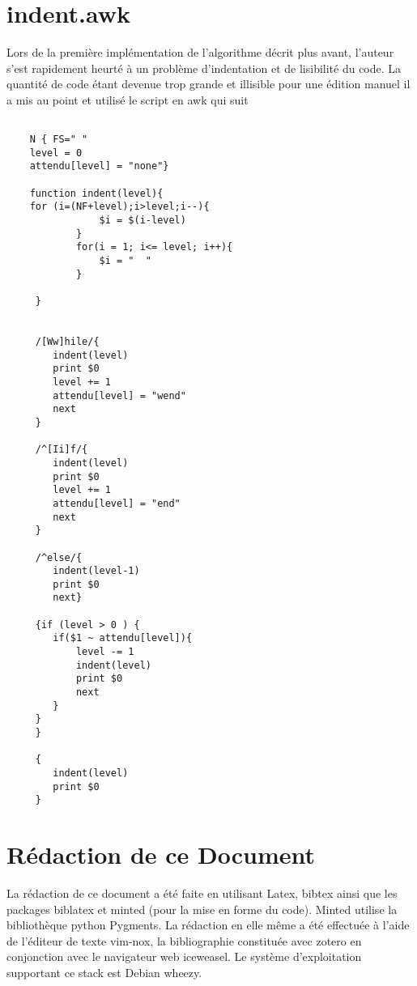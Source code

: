 \documentclass[11pt]{report}
\begin{document}
\section{indent.awk}
Lors de la première implémentation de l'algorithme décrit plus avant, l'auteur s'est rapidement heurté à un problème d'indentation et de lisibilité du code. La quantité de code étant devenue trop grande et illisible pour une édition manuel il a mis au point et utilisé le script en awk\cite{awk} qui suit
\begin{verbatim}

	N { FS=" " 
	level = 0
	attendu[level] = "none"}

	function indent(level){
	for (i=(NF+level);i>level;i--){
				$i = $(i-level)
			}
			for(i = 1; i<= level; i++){
				$i = "  "
			}

	 }


	 /[Ww]hile/{
		indent(level)
		print $0
		level += 1
		attendu[level] = "wend"
		next
	 }

	 /^[Ii]f/{
		indent(level)
		print $0
		level += 1
		attendu[level] = "end"
		next
	 }

	 /^else/{
		indent(level-1)
		print $0
		next}

	 {if (level > 0 ) {
		if($1 ~ attendu[level]){
			level -= 1
			indent(level)
			print $0
			next
		}
	 }
	 }

	 {
		indent(level)
		print $0
	 }
\end{verbatim}
\section{Rédaction de ce Document}
La rédaction de ce document a été faite en utilisant Latex\cite{latex}, bibtex\cite{bibtex} ainsi que les packages biblatex\cite{biblatex} et minted\cite{minted} (pour la mise en forme du code).
Minted utilise la bibliothèque python Pygments\cite{Pygments}.
 La rédaction en elle même a été effectuée à l'aide de l'éditeur de texte vim-nox\cite{vimnox}, la bibliographie constituée avec zotero\cite{zotero} en conjonction avec le navigateur web iceweasel.
 Le système d'exploitation supportant ce stack est Debian wheezy\cite{debian}.

\printbibliography
\end{document}
